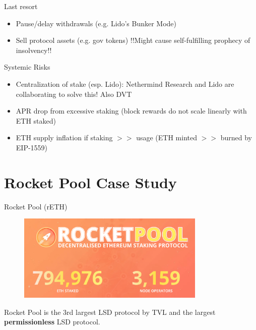 \documentclass{beamer}
\begin{document}
\begin{frame}{Last resort}
    \begin{itemize}
        \item Pause/delay withdrawals (e.g. Lido's Bunker Mode)
        \item Sell protocol assets (e.g. gov tokens) !!Might cause self-fulfilling prophecy of insolvency!!
    \end{itemize}
    
\end{frame}

\begin{frame}{Systemic Risks}
    \begin{itemize}
        \item Centralization of stake (esp. Lido): Nethermind Research and Lido are collaborating to solve this\footnotemark! Also DVT
        \item APR drop from excessive staking (block rewards do not scale linearly with ETH staked)
        \item ETH supply inflation if staking $>>$ usage (ETH minted $>>$ burned by EIP-1559)
    \end{itemize}

\end{frame}

\section[Rocket Pool Case Study]{Rocket Pool Case Study}

\begin{frame}{Rocket Pool (rETH)}
    \begin{figure}
        \centering
        \includegraphics[width=0.8\textwidth]{figures/rpl_logo.png}
    \end{figure}
    Rocket Pool is the 3rd largest LSD protocol by TVL and the largest \textbf{permissionless} LSD protocol.
\end{frame}
\end{document}
